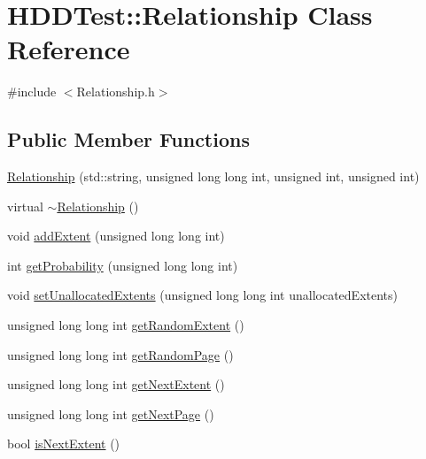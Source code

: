 \hypertarget{class_h_d_d_test_1_1_relationship}{\section{H\-D\-D\-Test\-:\-:Relationship Class Reference}
\label{class_h_d_d_test_1_1_relationship}
}


{\ttfamily \#include $<$Relationship.\-h$>$}

\subsection*{Public Member Functions}
\begin{DoxyCompactItemize}
\item 
\hyperlink{class_h_d_d_test_1_1_relationship_af9d1d6d29eb4bdeb72b4819d68b17956}{Relationship} (std\-::string, unsigned long long int, unsigned int, unsigned int)
\item 
virtual \hyperlink{class_h_d_d_test_1_1_relationship_a57554a697ebd4128d471dc3a103020c6}{$\sim$\-Relationship} ()
\item 
void \hyperlink{class_h_d_d_test_1_1_relationship_a4ad8ec27a4d984c8ee32ab2c7850cea7}{add\-Extent} (unsigned long long int)
\item 
int \hyperlink{class_h_d_d_test_1_1_relationship_aaa19b28455227ef6d859d55f7a789f37}{get\-Probability} (unsigned long long int)
\item 
void \hyperlink{class_h_d_d_test_1_1_relationship_a56e5c53a0f3cb8ea86b18aef057ea61a}{set\-Unallocated\-Extents} (unsigned long long int unallocated\-Extents)
\item 
unsigned long long int \hyperlink{class_h_d_d_test_1_1_relationship_aab85efd51398e63d39757f6687eb0ecb}{get\-Random\-Extent} ()
\item 
unsigned long long int \hyperlink{class_h_d_d_test_1_1_relationship_a74ccc8382a49d15d4ddd3673edef1ccc}{get\-Random\-Page} ()
\item 
unsigned long long int \hyperlink{class_h_d_d_test_1_1_relationship_a4056c89b36da88b193ad5121b496a191}{get\-Next\-Extent} ()
\item 
unsigned long long int \hyperlink{class_h_d_d_test_1_1_relationship_ad75f07a4f643229d0a5936746218e447}{get\-Next\-Page} ()
\item 
bool \hyperlink{class_h_d_d_test_1_1_relationship_a53966cb62025f69c97a18919e83b98c0}{is\-Next\-Extent} ()
\end{DoxyCompactItemize}
